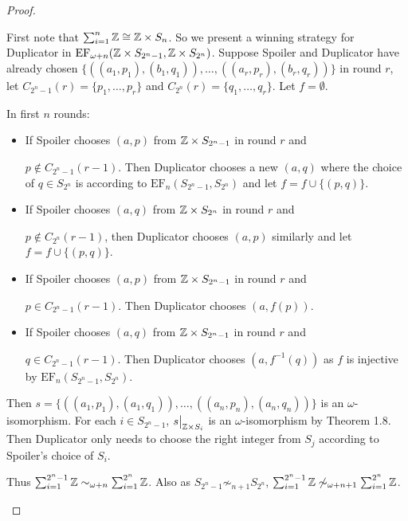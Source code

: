\documentclass[11pt]{article}
\def \EF {\text{EF}}
\begin{document}
\begin{proof}
\begin{enumerate}
 First note that \(\sum_{i=1}^{n}\mathbb{Z}\cong\mathbb{Z}\times S_n\). So we present a winning strategy for Duplicator
in \(\EF_{\omega+n}(\Z\times S_{2^n-1},\Z\times S_{2^n})\). Suppose Spoiler and Duplicator have already chosen
\(\{((a_1,p_1),(b_1,q_1)),\dots,((a_r,p_r),(b_r,q_r))\}\) in round \(r\), let \(C_{2^n-1}(r)=\{p_1,\dots,p_r\}\)
and \(C_{2^n}(r)=\{q_1,\dots,q_r\}\). Let \(f=\emptyset\).

In first \(n\) rounds:
\begin{itemize}
\item If Spoiler chooses \((a,p)\) from \(\mathbb{Z}\times S_{2^n-1}\) in round \(r\) and\par \(p\notin C_{2^n-1}(r-1)\). Then
Duplicator chooses a new \((a,q)\) where the choice of \(q\in S_{2^n}\) is according
to \(\EF_n(S_{2^n-1},S_{2^n})\) and let \(f=f\cup\{(p,q)\}\).
\item If Spoiler chooses \((a,q)\) from \(\mathbb{Z}\times S_{2^n}\) in round \(r\) and\par \(p\notin C_{2^n}(r-1)\), then
Duplicator chooses \((a,p)\) similarly and let \(f=f\cup\{(p,q)\}\).
\item If Spoiler chooses \((a,p)\) from \(\mathbb{Z}\times S_{2^n-1}\) in round \(r\) and\par \(p\in C_{2^n-1}(r-1)\). Then
Duplicator chooses \((a,f(p))\).
\item If Spoiler chooses \((a,q)\) from \(\mathbb{Z}\times S_{2^n-1}\) in round \(r\) and\par \(q\in C_{2^n-1}(r-1)\). Then
Duplicator chooses \((a,f^{-1}(q))\) as \(f\) is injective by \(\EF_n(S_{2^n-1},S_{2^n})\).
\end{itemize}

Then \(s=\{((a_1,p_1),(a_1,q_1)),\dots,((a_n,p_n),(a_n,q_n))\}\) is an \(\omega\)-isomorphism. For
each \(i\in S_{2^n-1}\), \(\restr{s}{\Z\times S_i}\) is an \(\omega\)-isomorphism by Theorem 1.8. Then Duplicator
only needs to choose the right integer from \(S_j\) according to Spoiler's choice of \(S_i\).

Thus \(\sum_{i=1}^{2^n-1}\mathbb{Z}\sim_{\omega+n}\sum_{i=1}^{2^n}\mathbb{Z}\). Also as \(S_{2^n-1}\not\sim_{n+1} S_{2^n}\), \(\sum_{i=1}^{2^n-1}\mathbb{Z}\not\sim_{\omega+n+1}\sum_{i=1}^{2^n}\mathbb{Z}\).
\end{enumerate}
\end{proof}
\end{document}
